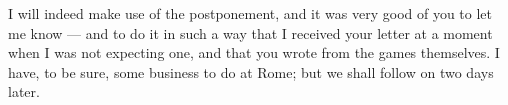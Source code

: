 

 I will indeed make use of the postponement, and it was very good of you to let me know --- and to do it in such a way that I received your letter at a moment when I was not expecting one, and that you wrote from the games themselves. I have, to be sure, some business to do at Rome; but we shall follow on two days later.
